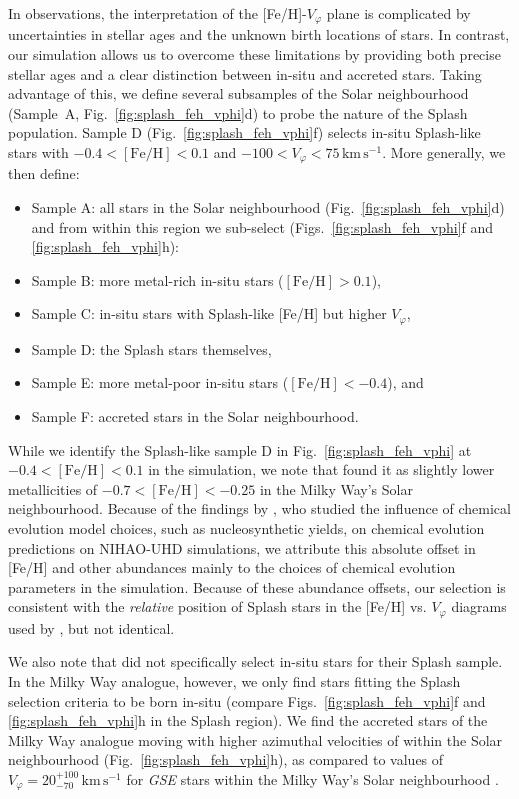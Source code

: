 \documentclass[fleqn,usenatbib]{mnras}
\begin{document}
In observations, the interpretation of the [Fe/H]-$V_\varphi$ plane is complicated by uncertainties in stellar ages and the unknown birth locations of stars. In contrast, our simulation allows us to overcome these limitations by providing both precise stellar ages and a clear distinction between in-situ and accreted stars. Taking advantage of this, we define several subsamples of the Solar neighbourhood (Sample~A, Fig.~\ref{fig:splash_feh_vphi}d) to probe the nature of the Splash population. Sample D (Fig.~\ref{fig:splash_feh_vphi}f) selects in-situ Splash-like stars with $-0.4 < \mathrm{[Fe/H]} < 0.1$ and $-100 < V_\varphi < 75\,\mathrm{km\,s^{-1}}$.  More generally, we then define:
\begin{itemize}[leftmargin=2em,labelwidth=2em]
    \item Sample A: all stars in the Solar neighbourhood (Fig.~\ref{fig:splash_feh_vphi}d) \\
    and from within this region we sub-select (Figs.~\ref{fig:splash_feh_vphi}f and \ref{fig:splash_feh_vphi}h):
    \item Sample B: more metal-rich in-situ stars ($\mathrm{[Fe/H]} > 0.1$),
    \item Sample C: in-situ stars with Splash-like [Fe/H] but higher $V_\varphi$,
    \item Sample D: the Splash stars themselves,
    \item Sample E: more metal-poor in-situ stars ($\mathrm{[Fe/H]} < -0.4$), and
    \item Sample F: accreted stars in the Solar neighbourhood.
\end{itemize}

While we identify the Splash-like sample D in Fig.~\ref{fig:splash_feh_vphi} at $-0.4 < \mathrm{[Fe/H]} < 0.1$ in the simulation, we note that \citet{Belokurov2020} found it as slightly lower metallicities of $-0.7 < \mathrm{[Fe/H]} < -0.25$ in the Milky Way's Solar neighbourhood. Because of the findings by \citet{Buck2021}, who studied the influence of chemical evolution model choices, such as nucleosynthetic yields, on chemical evolution predictions on NIHAO-UHD simulations, we attribute this absolute offset in [Fe/H] and other abundances mainly to the choices of chemical evolution parameters in the simulation. Because of these abundance offsets, our selection is consistent with the \textit{relative} position of Splash stars in the [Fe/H] vs. $V_\varphi$ diagrams used by \citet{Belokurov2020}, but not identical.

We also note that \citet{Belokurov2020} did not specifically select in-situ stars for their Splash sample. In the Milky Way analogue, however, we only find stars fitting the Splash selection criteria to be born in-situ (compare Figs.~\ref{fig:splash_feh_vphi}f and \ref{fig:splash_feh_vphi}h in the Splash region). We find the accreted stars of the Milky Way analogue moving with higher azimuthal velocities of  within the Solar neighbourhood (Fig.~\ref{fig:splash_feh_vphi}h), as compared to values of $V_\varphi = 20_{-70}^{+100}\,\mathrm{km\,s^{-1}}$ for \textit{GSE} stars within the Milky Way's Solar neighbourhood \citep{Buder2022}.
\end{document}
